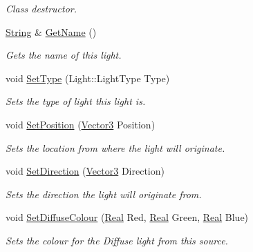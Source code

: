 \begin{DoxyCompactItemize}
\begin{DoxyCompactList}\small\item\em Class destructor. \item\end{DoxyCompactList}\item 
\hyperlink{namespacephys_aa03900411993de7fbfec4789bc1d392e}{String} \& \hyperlink{classphys_1_1Light_a8e81734d570edd31b0a7ae6b1b3a194e}{GetName} ()
\begin{DoxyCompactList}\small\item\em Gets the name of this light. \item\end{DoxyCompactList}\item 
void \hyperlink{classphys_1_1Light_a87fced0afb0fd44d333c499d41e8568a}{SetType} (Light::LightType Type)
\begin{DoxyCompactList}\small\item\em Sets the type of light this light is. \item\end{DoxyCompactList}\item 
void \hyperlink{classphys_1_1Light_a9c2fcbd1f46ccac815ca7f1b00585c13}{SetPosition} (\hyperlink{classphys_1_1Vector3}{Vector3} Position)
\begin{DoxyCompactList}\small\item\em Sets the location from where the light will originate. \item\end{DoxyCompactList}\item 
void \hyperlink{classphys_1_1Light_a7020d242add6fe47939b3efb3b207f71}{SetDirection} (\hyperlink{classphys_1_1Vector3}{Vector3} Direction)
\begin{DoxyCompactList}\small\item\em Sets the direction the light will originate from. \item\end{DoxyCompactList}\item 
void \hyperlink{classphys_1_1Light_aa54aed6085b348631daa26bc820bb715}{SetDiffuseColour} (\hyperlink{namespacephys_af7eb897198d265b8e868f45240230d5f}{Real} Red, \hyperlink{namespacephys_af7eb897198d265b8e868f45240230d5f}{Real} Green, \hyperlink{namespacephys_af7eb897198d265b8e868f45240230d5f}{Real} Blue)
\begin{DoxyCompactList}\small\item\em Sets the colour for the Diffuse light from this source. \item\end{DoxyCompactList}\item 

\end{DoxyCompactItemize}
